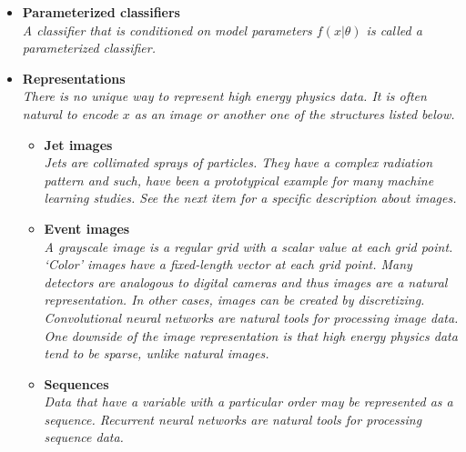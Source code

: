 \documentclass[12pt,letterpaper]{article}
\begin{document}
\begin{itemize}
	\begin{itemize}
		\item \textbf{Parameterized classifiers}~\cite{Aguilar-Saavedra:2025zgs,Chen:2023ind,Nachman:2021yvi,Cranmer:2015bka,Baldi:2016fzo}
		\\\textit{A classifier that is conditioned on model parameters $f(x|\theta)$ is called a parameterized classifier.}
		\item \textbf{Representations}
			\\\textit{There is no unique way to represent high energy physics data.  It is often natural to encode $x$ as an image or another one of the structures listed below.}
			\begin{itemize}
				\item \textbf{Jet images}~\cite{Kheddar:2024osf,Han:2023djl,Choi:2023slq,Filipek:2021qbe,Du:2020pmp,collado2021learning,Lee:2019cad,li2020attention,li2020reconstructing,Macaluso:2018tck,Kasieczka:2017nvn,Komiske:2016rsd,Barnard:2016qma,Komiske:2018oaa,Lin:2018cin,ATL-PHYS-PUB-2017-017,deOliveira:2015xxd,Almeida:2015jua,Cogan:2014oua,Pumplin:1991kc}
				\\\textit{Jets are collimated sprays of particles.  They have a complex radiation pattern and such, have been a prototypical example for many machine learning studies.  See the next item for a specific description about images.}
				\item \textbf{Event images}~\cite{Andriamirado:2025fht,Murali:2024xnf,He:2024ppu,Ban:2023jfo,Yang:2023djv,Bae:2022dnw,Pol:2021iqw,Andrews:2021ejw,Du:2019civ,Chung:2020ysf,Andrews:2018nwy,Lin:2018cin,ATL-PHYS-PUB-2019-028,Nguyen:2018ugw}
				\\\textit{A grayscale image is a regular grid with a scalar value at each grid point.  `Color' images have a fixed-length vector at each grid point.  Many detectors are analogous to digital cameras and thus images are a natural representation.  In other cases, images can be created by discretizing.   Convolutional neural networks are natural tools for processing image data.  One downside of the image representation is that high energy physics data tend to be sparse, unlike natural images.}
				\item \textbf{Sequences}~\cite{ATL-PHYS-PUB-2017-003,deLima:2021fwm,goto2021development,Bols:2020bkb,Nguyen:2018ugw,Guest:2016iqz}
				\\\textit{Data that have a variable with a particular order may be represented as a sequence.  Recurrent neural networks are natural tools for processing sequence data. }

\end{itemize}
\end{itemize}
\end{itemize}
\end{document}
